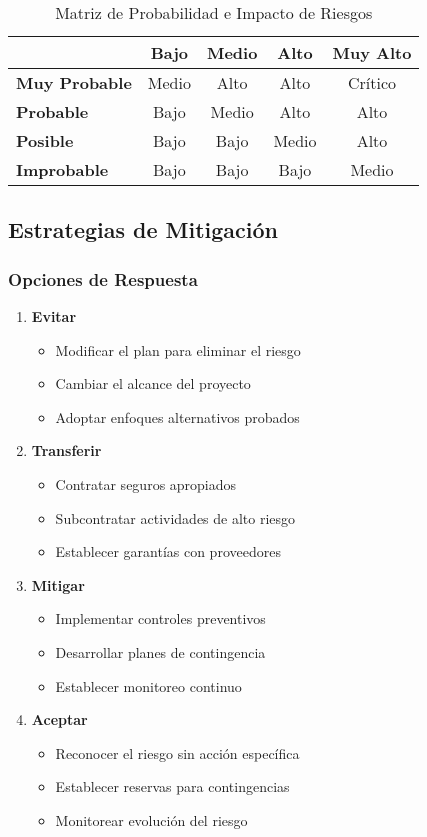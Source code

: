 \documentclass[12pt,letterpaper,oneside]{book}
\begin{document}
\begin{table}[H]
\centering
\caption{Matriz de Probabilidad e Impacto de Riesgos}
\begin{tabular}{|l|c|c|c|c|}
\hline
& \textbf{Bajo} & \textbf{Medio} & \textbf{Alto} & \textbf{Muy Alto} \\
\hline
\textbf{Muy Probable} & Medio & Alto & Alto & Crítico \\
\hline
\textbf{Probable} & Bajo & Medio & Alto & Alto \\
\hline
\textbf{Posible} & Bajo & Bajo & Medio & Alto \\
\hline
\textbf{Improbable} & Bajo & Bajo & Bajo & Medio \\
\hline
\end{tabular}
\end{table}

\subsection{Estrategias de Mitigación}

\subsubsection{Opciones de Respuesta}

\begin{enumerate}
\item \textbf{Evitar}
   \begin{itemize}
   \item Modificar el plan para eliminar el riesgo
   \item Cambiar el alcance del proyecto
   \item Adoptar enfoques alternativos probados
   \end{itemize}

\item \textbf{Transferir}
   \begin{itemize}
   \item Contratar seguros apropiados
   \item Subcontratar actividades de alto riesgo
   \item Establecer garantías con proveedores
   \end{itemize}

\item \textbf{Mitigar}
   \begin{itemize}
   \item Implementar controles preventivos
   \item Desarrollar planes de contingencia
   \item Establecer monitoreo continuo
   \end{itemize}

\item \textbf{Aceptar}
   \begin{itemize}
   \item Reconocer el riesgo sin acción específica
   \item Establecer reservas para contingencias
   \item Monitorear evolución del riesgo
   \end{itemize}
\end{enumerate}
\end{document}
